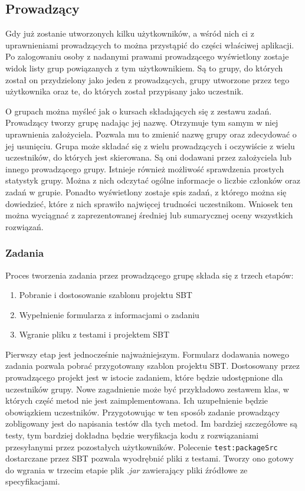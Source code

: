 \documentclass[brudnopis]{xmgr}
\begin{document}
\subsection{Prowadzący}

Gdy już zostanie utworzonych kilku użytkowników, a wśród nich ci z uprawnieniami prowadzących to można przystąpić do części właściwej aplikacji. Po zalogowaniu osoby z nadanymi prawami prowadzącego wyświetlony zostaje widok listy grup powiązanych z tym użytkownikiem. Są to grupy, do których został on przydzielony jako jeden z prowadzących, grupy utworzone przez tego użytkownika oraz te, do których został przypisany jako uczestnik. 

O grupach można myśleć jak o kursach składających się z zestawu zadań. Prowadzący tworzy grupę nadając jej nazwę. Otrzymuje tym samym w niej uprawnienia założyciela. Pozwala mu to zmienić nazwę grupy oraz zdecydować o jej usunięciu. Grupa może składać się z wielu prowadzących i oczywiście z wielu uczestników, do których jest skierowana. Są oni dodawani przez założyciela lub innego prowadzącego grupy. Istnieje również możliwość sprawdzenia prostych statystyk grupy. Można z nich odczytać ogólne informacje o liczbie członków oraz zadań w grupie. Ponadto wyświetlony zostaje spis zadań, z którego można się dowiedzieć, które z nich sprawiło najwięcej trudności uczestnikom. Wniosek ten można wyciągnać z zaprezentowanej średniej lub sumarycznej oceny wszystkich rozwiązań.

\subsubsection{Zadania}

Proces tworzenia zadania przez prowadzącego grupę składa się z trzech etapów: 

\begin{enumerate}
\item Pobranie i dostosowanie szablonu projektu SBT
\item Wypełnienie formularza z informacjami o zadaniu
\item Wgranie pliku z testami i projektem SBT
\end{enumerate}

Pierwszy etap jest jednocześnie najważniejszym. Formularz dodawania nowego zadania pozwala pobrać przygotowany szablon projektu SBT. Dostosowany przez prowadzącego projekt jest w istocie zadaniem, które będzie udostępnione dla uczestników grupy. Nowe zagadnienie może być przykładowo zestawem klas, w których część metod nie jest zaimplementowana. Ich uzupełnienie będzie obowiązkiem uczestników. Przygotowując w ten sposób zadanie prowadzący zobligowany jest do napisania testów dla tych metod. Im bardziej szczegółowe są testy, tym bardziej dokładna będzie weryfikacja kodu z rozwiązaniami przesyłanymi przez pozostałych użytkowników. Polecenie \texttt{test:packageSrc} dostarczane przez SBT pozwala wyodrębnić pliki z testami. Tworzy ono gotowy do wgrania w trzecim etapie plik \emph{.jar} zawierający pliki źródłowe ze specyfikacjami. 
\end{document}
